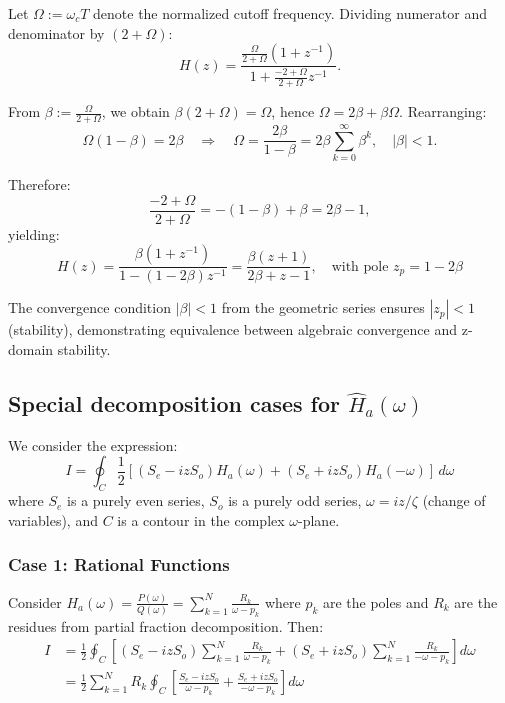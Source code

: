Let $\Omega := \omega_c T$ denote the normalized cutoff frequency. Dividing numerator and denominator by $(2 + \Omega)$:
\[
H(z) = \frac{\frac{\Omega}{2 + \Omega}(1+z^{-1})}{1 + \frac{-2 + \Omega}{2 + \Omega}z^{-1}}.
\]

From $\beta := \frac{\Omega}{2 + \Omega}$, we obtain $\beta(2 + \Omega) = \Omega$, hence $\Omega = 2\beta + \beta\Omega$. Rearranging:
\[
\Omega(1 - \beta) = 2\beta \quad \Longrightarrow \quad \Omega = \frac{2\beta}{1-\beta} = 2\beta \sum_{k=0}^{\infty} \beta^k, \quad |\beta| < 1.
\]

Therefore:
\[
\frac{-2 + \Omega}{2 + \Omega} = -(1-\beta) + \beta = 2\beta - 1,
\]
yielding:
\begin{equation}
H(z) = \frac{\beta(1+z^{-1})}{1 - (1-2\beta)z^{-1}}
= \frac{\beta(z + 1)}{2\beta + z - 1}, \quad \text{with pole } z_p = 1 - 2\beta
\label{eq:digital_lpf}
\end{equation}

The convergence condition $|\beta| < 1$ from the geometric series ensures $|z_p| < 1$ (stability), demonstrating equivalence between algebraic convergence and z-domain stability.

\subsection{Special decomposition cases for $\hat{H}_a(\omega)$}\label{app:special-decomp}

We consider the expression:
\[
I = \oint_C \frac{1}{2} [(S_e - iz S_o)H_a(\omega) + (S_e + iz S_o)H_a(-\omega)] \, d\omega
\]
where $S_e$ is a purely even series, $S_o$ is a purely odd series, $\omega = iz/\zeta$ (change of variables), and $C$ is a contour in the complex $\omega$-plane.

\subsubsection{Case 1: Rational Functions}\label{app:case-rational}

Consider $H_a(\omega) = \frac{P(\omega)}{Q(\omega)} = \sum_{k=1}^{N} \frac{R_k}{\omega - p_k}$ where $p_k$ are the poles and $R_k$ are the residues from partial fraction decomposition. Then:
\begin{align*}
I &= \frac{1}{2}\oint_C \left[(S_e - izS_o)\sum_{k=1}^{N}\frac{R_k}{\omega - p_k} + (S_e + izS_o)\sum_{k=1}^{N}\frac{R_k}{-\omega - p_k}\right] d\omega \\
&= \frac{1}{2}\sum_{k=1}^{N} R_k \oint_C \left[\frac{S_e - izS_o}{\omega - p_k} + \frac{S_e + izS_o}{-\omega - p_k}\right] d\omega
\end{align*}


